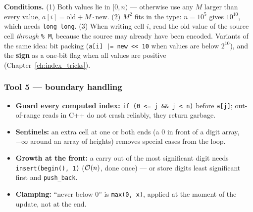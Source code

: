 \begin{diagrambox}
\end{diagrambox}

\textbf{Conditions.} (1) Both values lie in $[0, n)$ --- otherwise use any $M$ larger than every value, $a[i] = \text{old} + M \cdot \text{new}$. (2) $M^2$ fits in the type: $n = 10^5$ gives $10^{10}$, which needs \texttt{long long}. (3) When writing cell $i$, read the old value of the source cell \emph{through} \texttt{\% M}, because the source may already have been encoded. Variants of the same idea: bit packing (\texttt{a[i] |= new << 10} when values are below $2^{10}$), and the \textbf{sign} as a one-bit flag when all values are positive (Chapter~\ref{ch:index_tricks}).

\subsubsection*{Tool 5 --- boundary handling}

\begin{itemize}[leftmargin=*]
    \item \textbf{Guard every computed index:} \texttt{if (0 <= j \&\& j < n)} before \texttt{a[j]}; out-of-range reads in C++ do not crash reliably, they return garbage.
    \item \textbf{Sentinels:} an extra cell at one or both ends (a $0$ in front of a digit array, $-\infty$ around an array of heights) removes special cases from the loop.
    \item \textbf{Growth at the front:} a carry out of the most significant digit needs \texttt{insert(begin(), 1)} ($\mathcal{O}(n)$, done once) --- or store digits least significant first and \texttt{push\_back}.
    \item \textbf{Clamping:} ``never below 0'' is \texttt{max(0, x)}, applied at the moment of the update, not at the end.
\end{itemize}

